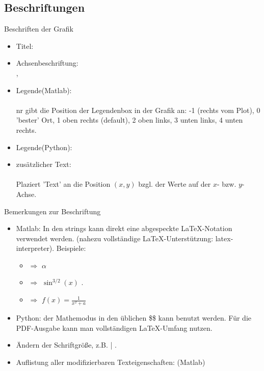 \documentclass[hyperref={xetex}]{beamer}
\begin{document}
\subsection{Beschriftungen}
% 
% 
\begin{frame}[fragile]{Beschriften der Grafik}
\begin{itemize}
\item Titel: \\ 
\alert{ }
\item Achsenbeschriftung:\\
\alert{ },
  \alert{ } 
\item Legende(Matlab):\\
\alert{ } \\
{\scriptsize \alert{ nr} gibt die Position der Legendenbox in der Grafik an:
  -1 (rechts vom Plot), 0 'bester' Ort, 1 oben rechts (default), 2
  oben links, 3 unten links, 4 unten rechts. }
\item Legende(Python):\\ 
\alert{}
\item zusätzlicher Text:\\ \alert{ }\\ Plaziert
  'Text' an die Position $(x,y)$ bzgl. der Werte auf der $x$-
  bzw. $y$-Achse. 
\end{itemize}
\end{frame}
% 
% 
\begin{frame}[fragile]{Bemerkungen zur Beschriftung}
\begin{itemize}
  \item  \alert{Matlab:} In den strings kann direkt eine abgespeckte \LaTeX-Notation verwendet werden. (nahezu vollständige 
\LaTeX-Unterstützung: latex-interpreter). 
Beispiele: 
\begin{itemize} \item \imatlab{\\alpha} $\Rightarrow$ $\alpha$
\item {} $\Rightarrow$ $\sin^{3/2}(x)$ .
\item {}
$\Rightarrow$ $f(x) = \frac{1}{x^2+a}$
\end{itemize}
\item \alert{Python:} der Mathemodus in den üblichen \$\$ kann benutzt werden. Für die PDF-Ausgabe kann man vollständigen \LaTeX-Umfang nutzen.
\item Ändern der Schriftgröße, z.B. | .
\item Auflistung aller modifizierbaren Texteigenschaften: (Matlab)
\end{itemize}
\end{frame}
\end{document}
